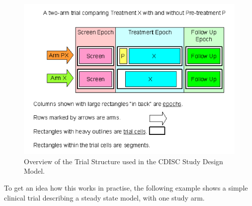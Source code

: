 \documentclass[a4paper,11pt]{article}
\begin{document}
\begin{figure}[htb]
\includegraphics[width=\linewidth]{./CDISCTrialStructure}
\caption{Overview of the Trial Structure used in the CDISC Study
  Design Model.}
\label{fig:cdiscstruct}
\end{figure}


To get an idea how this works in practise, the following example shows
a simple clinical trial describing a steady state model, with one
study arm.
\end{document}
